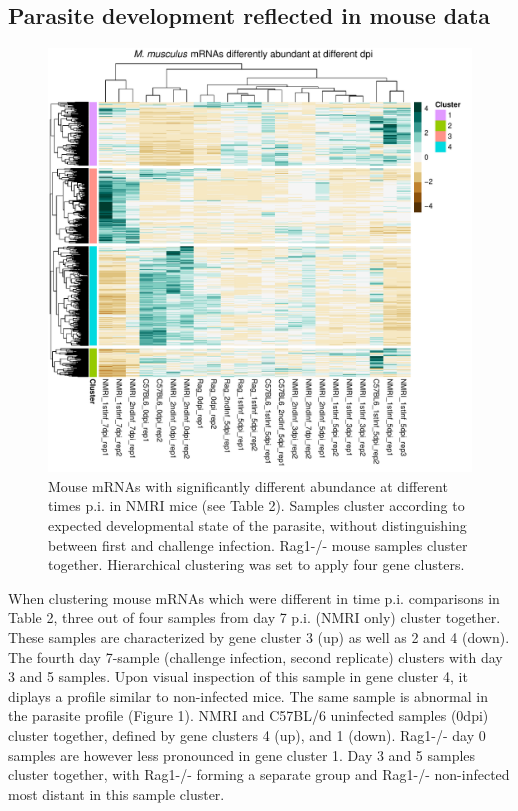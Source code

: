 \documentclass{bmcart}
\begin{document}
\clearpage
\subsection{Parasite development reflected in mouse data}
\begin{figure}[h!]
\includegraphics[width=\linewidth]{MmLifecycleHeatmap.pdf}  
\caption{Mouse mRNAs with significantly different abundance at different times p.i. in NMRI mice (see Table 2). Samples cluster according to expected developmental state of the parasite, without distinguishing between first and challenge infection. Rag1-/- mouse samples cluster together. Hierarchical clustering was set to apply four gene clusters.}
\end{figure}

When clustering mouse mRNAs which were different in time p.i. comparisons in Table 2, three out of four samples from day 7 p.i. (NMRI only) cluster together. These samples are characterized by gene cluster 3 (up) as well as 2 and 4 (down). The fourth day 7-sample (challenge infection, second replicate) clusters with day 3 and 5 samples. Upon visual inspection of this sample in gene cluster 4, it diplays a profile similar to non-infected mice. The same sample is abnormal in the parasite profile (Figure 1). NMRI and C57BL/6 uninfected samples (0dpi) cluster together, defined by gene clusters 4 (up), and 1 (down). Rag1-/- day 0 samples are however less pronounced in gene cluster 1. Day 3 and 5 samples cluster together, with Rag1-/- forming a separate group and Rag1-/- non-infected most distant in this sample cluster.
\end{document}
